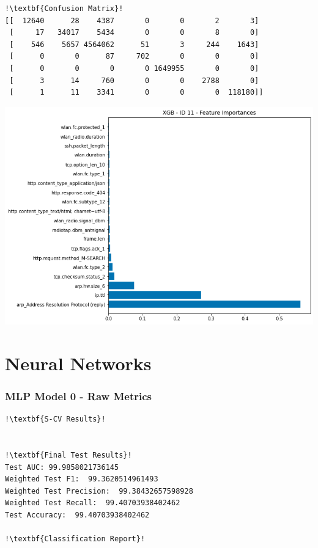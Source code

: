 \begin{appendices}
\begin{lstlisting}[escapechar=!]
!\textbf{Confusion Matrix}!    
[[  12640      28    4387       0       0       2       3]
 [     17   34017    5434       0       0       8       0]
 [    546    5657 4564062      51       3     244    1643]
 [      0       0      87     702       0       0       0]
 [      0       0       0       0 1649955       0       0]
 [      3      14     760       0       0    2788       0]
 [      1      11    3341       0       0       0  118180]]

\end{lstlisting}
\begin{center}
	\centering
	\includegraphics[width=\textwidth]{Appendices/Images/XGB/Model11/XGB_Model11_FI.png}
\end{center}


\clearpage
\section{Neural Networks}
\label{appx: Neural Networks}

\subsubsection{MLP Model 0 - Raw Metrics}
\begin{lstlisting}[escapechar=!]
!\textbf{S-CV Results}!


!\textbf{Final Test Results}!
Test AUC: 99.9858021736145
Weighted Test F1:  99.3620514961493
Weighted Test Precision:  99.38432657598928
Weighted Test Recall:  99.40703938402462
Test Accuracy:  99.40703938402462

!\textbf{Classification Report}!


\end{lstlisting}
\end{appendices}
